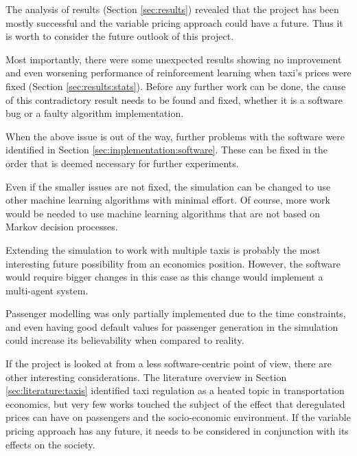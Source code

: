 The analysis of results (Section \ref{sec:results}) revealed that the project
has been mostly successful and the variable pricing approach could have a
future. Thus it is worth to consider the future outlook of this project.

Most importantly, there were some unexpected results showing no improvement and
even worsening performance of reinforcement learning when taxi's prices were
fixed (Section \ref{sec:results:stats}). Before any further work can be done,
the cause of this contradictory result needs to be found and fixed, whether it
is a software bug or a faulty algorithm implementation.

When the above issue is out of the way, further problems with the software were
identified in Section \ref{sec:implementation:software}. These can be fixed in
the order that is deemed necessary for further experiments. 

Even if the smaller issues are not fixed, the simulation can be changed to use
other machine learning algorithms with minimal effort. Of course, more work
would be needed to use machine learning algorithms that are not based on Markov
decision processes.

Extending the simulation to work with multiple taxis is probably the most
interesting future possibility from an economics position. However, the
software would require bigger changes in this case as this change would
implement a multi-agent system.

Passenger modelling was only partially implemented due to the time constraints,
and even having good default values for passenger generation in the simulation
could increase its believability when compared to reality.

If the project is looked at from a less software-centric point of view, there
are other interesting considerations. The literature overview in Section
\ref{sec:literature:taxis} identified taxi regulation as a heated topic in
transportation economics, but very few works touched the subject of the effect
that deregulated prices can have on passengers and the socio-economic
environment. If the variable pricing approach has any future, it needs to be
considered in conjunction with its effects on the society.
